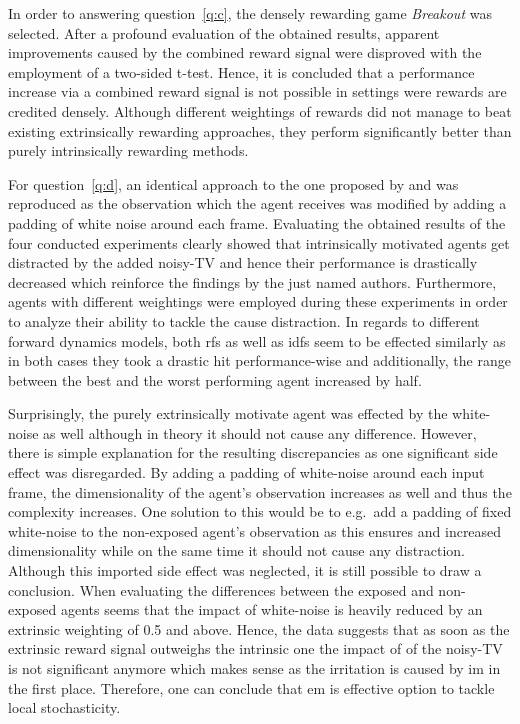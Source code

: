 \documentclass[draft,final]{vutinfth} %
\begin{document}
    In order to answering question~\ref{q:c}, the densely rewarding game \textit{Breakout} was selected.
    After a profound evaluation of the obtained results, apparent improvements caused by the combined reward signal were disproved with the employment of a two-sided t-test.
    Hence, it is concluded that a performance increase via a combined reward signal is not possible in settings were rewards are credited densely.
    Although different weightings of rewards did not manage to beat existing extrinsically rewarding approaches, they perform significantly better than purely intrinsically rewarding methods.

    For question~\ref{q:d}, an identical approach to the one proposed by \citet{pathak_curiosity-driven_2017-1} and \citet{burda_large-scale_2018-1} was reproduced as the observation which the agent receives was modified by adding a padding of white noise around each frame.
    Evaluating the obtained results of the four conducted experiments clearly showed that intrinsically motivated agents get distracted by the added noisy-TV and hence their performance is drastically decreased which reinforce the findings by the just named authors.
    Furthermore, agents with different weightings were employed during these experiments in order to analyze their ability to tackle the cause distraction.
    In regards to different forward dynamics models, both \glspl{rf} as well as \glspl{idf} seem to be effected similarly as in both cases they took a drastic hit performance-wise and additionally, the range between the best and the worst performing agent increased by half.

    Surprisingly, the purely extrinsically motivate agent was effected by the white-noise as well although in theory it should not cause any difference.
    However, there is simple explanation for the resulting discrepancies as one significant side effect was disregarded.
    By adding a padding of white-noise around each input frame, the dimensionality of the agent's observation increases as well and thus the complexity increases.
    One solution to this would be to e.g.\ add a padding of fixed white-noise to the non-exposed agent's observation as this ensures and increased dimensionality while on the same time it should not cause any distraction.
    Although this imported side effect was neglected, it is still possible to draw a conclusion.
    When evaluating the differences between the exposed and non-exposed agents seems that the impact of white-noise is heavily reduced by an extrinsic weighting of 0.5 and above.
    Hence, the data suggests that as soon as the extrinsic reward signal outweighs the intrinsic one the impact of of the noisy-TV is not significant anymore which makes sense as the irritation is caused by \gls{im} in the first place.
    Therefore, one can conclude that \gls{em} is effective option to tackle local stochasticity.
\end{document}
